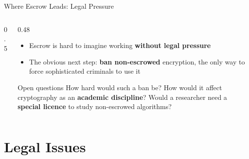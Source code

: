 \documentclass[aspectratio=169,11pt,xcolor={table}]{beamer}
\begin{document}
\begin{frame}{Where Escrow Leads: Legal Pressure}
  \begin{columns}[c]
    \begin{column}{0.5\textwidth}
      \centering
    \end{column}
    \begin{column}{0.48\textwidth}
      \begin{itemize}\small\setlength{\itemsep}{4pt}
        \item Escrow is hard to imagine working \textbf{without legal pressure}
        \item The obvious next step: \textbf{ban non-escrowed} encryption, the only way to force sophisticated criminals to use it
      \end{itemize}
      \begin{alertblock}{Open questions}
        \small How hard would such a ban be? How would it affect cryptography as an \textbf{academic discipline}? Would a researcher need a \textbf{special licence} to study non-escrowed algorithms?
      \end{alertblock}
    \end{column}
  \end{columns}
\end{frame}

\setcounter{section}{7}
\section{Legal Issues}
\end{document}
